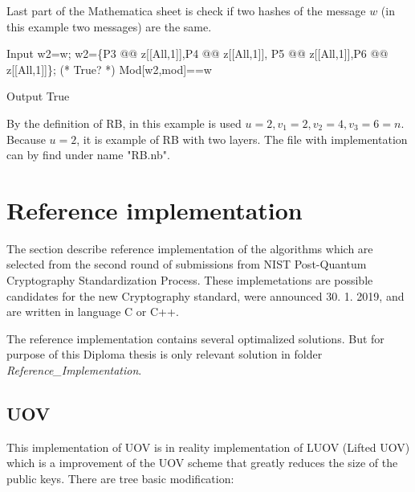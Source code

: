 \documentclass[thesis=M,english]{FITthesis}[2019/12/23]
\begin{document}
\bigskip
\noindent
Last part of the Mathematica sheet is check if two hashes of the message $w$ (in this example two messages) are the same.
\begin{mmaCell}[moredefined={w2, w, P5, P6, z, P4, P3, mod}]{Input}
  w2=w;
  w2=\{P3 @@ z[[All,1]],P4 @@ z[[All,1]],
      P5 @@ z[[All,1]],P6 @@ z[[All,1]]\};
  (* True? *)
  Mod[w2,mod]==w
\end{mmaCell}
\begin{mmaCell}[addtoindex=2]{Output}
  True
\end{mmaCell}
By the definition of RB, in this example is used $u=2, v_1=2, v_2=4, v_3=6=n$. Because $u=2$, it is example of RB with two layers.
The file with implementation can by find under name "RB.nb".

\lstset{basicstyle=\footnotesize\ttfamily}
\section{Reference implementation}
The section describe reference implementation of the algorithms which are selected from the second round of submissions from NIST Post-Quantum Cryptography Standardization Process.\cite{L-NIST-2ND} These implemetations are possible candidates for the new Cryptography standard, were announced 30. 1. 2019, and are written in language C or C++. 

\bigskip
\noindent
The reference implementation contains several optimalized solutions. But for purpose of this Diploma thesis is only relevant solution in folder \textit{Reference\_Implementation}.

\subsection{UOV}
This implementation of UOV is in reality implementation of LUOV (Lifted UOV) which is a improvement of the UOV scheme that greatly reduces the size of the public keys. There are tree basic modification:
\end{document}
